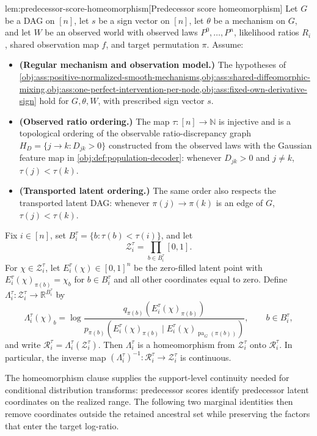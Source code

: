 \begin{lemmav}{lem:predecessor-score-homeomorphism}[Predecessor score homeomorphism]
Let \(G\) be a DAG on \([n]\), let \(s\) be a sign vector on \([n]\), let \(\theta\) be a mechanism on \(G\), and let \(W\) be an observed world with observed laws \(P^0,\ldots,P^n\), likelihood ratios \(R_i\), shared observation map \(f\), and target permutation \(\pi\). Assume:
\begin{itemize}
\item \textbf{(Regular mechanism and observation model.)} The hypotheses of \cref{obj:ass:positive-normalized-smooth-mechanisms,obj:ass:shared-diffeomorphic-mixing,obj:ass:one-perfect-intervention-per-node,obj:ass:fixed-own-derivative-sign} hold for \(G,\theta,W\), with prescribed sign vector \(s\).
\item \textbf{(Observed ratio ordering.)} The map \(\tau:[n]\to\mathbb N\) is injective and is a topological ordering of the observable ratio-discrepancy graph \(H_D=\{j\to k:D_{jk}>0\}\) constructed from the observed laws with the Gaussian feature map in \cref{obj:def:population-decoder}: whenever \(D_{jk}>0\) and \(j\ne k\), \(\tau(j)<\tau(k)\).
\item \textbf{(Transported latent ordering.)} The same order also respects the transported latent DAG: whenever \(\pi(j)\to\pi(k)\) is an edge of \(G\), \(\tau(j)<\tau(k)\).
\end{itemize}
Fix \(i\in[n]\), set \(B_i^\tau=\{b:\tau(b)<\tau(i)\}\), and let
\[
\mathcal Z_i^\tau=\prod_{b\in B_i^\tau}[0,1].
\]
For \(\chi\in\mathcal Z_i^\tau\), let \(E_i^\tau(\chi)\in[0,1]^n\) be the zero-filled latent point with \(E_i^\tau(\chi)_{\pi(b)}=\chi_b\) for \(b\in B_i^\tau\) and all other coordinates equal to zero. Define \(\Lambda_i^\tau:\mathcal Z_i^\tau\to\mathbb R^{B_i^\tau}\) by
\[
\Lambda_i^\tau(\chi)_b
=
\log
\frac{
q_{\pi(b)}\!\left(E_i^\tau(\chi)_{\pi(b)}\right)
}{
p_{\pi(b)}\!\left(E_i^\tau(\chi)_{\pi(b)}\mid E_i^\tau(\chi)_{\operatorname{pa}_G(\pi(b))}\right)
},
\qquad b\in B_i^\tau,
\]
and write \(\mathcal R_i^\tau=\Lambda_i^\tau(\mathcal Z_i^\tau)\). Then \(\Lambda_i^\tau\) is a homeomorphism from \(\mathcal Z_i^\tau\) onto \(\mathcal R_i^\tau\). In particular, the inverse map \((\Lambda_i^\tau)^{-1}:\mathcal R_i^\tau\to\mathcal Z_i^\tau\) is continuous.
\end{lemmav}

The homeomorphism clause supplies the support-level continuity needed for conditional distribution transforms: predecessor scores identify predecessor latent coordinates on the realized range. The following two marginal identities then remove coordinates outside the retained ancestral set while preserving the factors that enter the target log-ratio.

